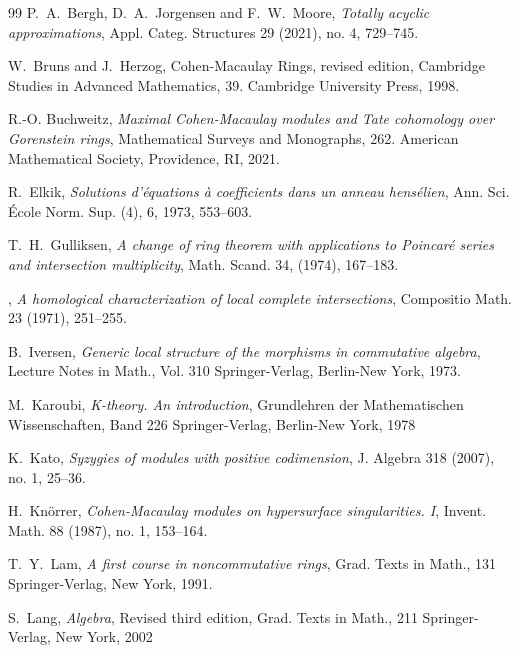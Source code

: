 \documentclass{amsart}
\theoremstyle{plain}
\theoremstyle{definition}
\theoremstyle{remark}
\begin{document}
{\begin{thebibliography} {99}
P.~A.~Bergh, D.~A.~Jorgensen and F.~W.~Moore,
\emph{Totally acyclic approximations},
Appl. Categ. Structures 29 (2021), no. 4, 729--745.


W.~Bruns and J.~Herzog,
Cohen-Macaulay Rings, revised edition,
Cambridge Studies in Advanced Mathematics, 39.
Cambridge University Press, 1998.

R.-O. Buchweitz,
\emph{Maximal {C}ohen-{M}acaulay modules and {T}ate cohomology over {G}orenstein rings},
 Mathematical Surveys and Monographs, 262. American Mathematical Society, Providence, RI, 2021.

R.~Elkik,
\emph{Solutions d'\'equations \`a{} coefficients dans un anneau hens\'elien},
Ann. Sci. \'Ecole Norm. Sup. (4), 6, 1973, 553--603.

T.~H.~Gulliksen,
\emph{A change of ring theorem with applications to Poincaré series and intersection multiplicity},
 Math. Scand. 34, (1974), 167--183.

\bysame,
\emph{A homological characterization of local complete intersections},
Compositio Math. 23 (1971), 251--255.



B.~Iversen,
 \emph{Generic local structure of the morphisms in commutative algebra},
Lecture Notes in Math., Vol. 310
Springer-Verlag, Berlin-New York, 1973.


 M.~Karoubi,
\emph{K-theory. An introduction},
Grundlehren der Mathematischen Wissenschaften, Band 226
Springer-Verlag, Berlin-New York, 1978

K.~Kato,
\emph{Syzygies of modules with positive codimension},
J. Algebra 318 (2007), no. 1, 25--36.


H.~Kn\"{o}rrer,
\emph{Cohen-Macaulay modules on hypersurface singularities. I},
Invent. Math. 88 (1987), no. 1, 153--164.

T.~Y.~Lam,
\emph{A first course in noncommutative rings},
Grad. Texts in Math., 131
Springer-Verlag, New York, 1991.

S.~Lang,
\emph{Algebra},
Revised third edition,
Grad. Texts in Math., 211
Springer-Verlag, New York, 2002



\end{thebibliography}}
\end{document}
